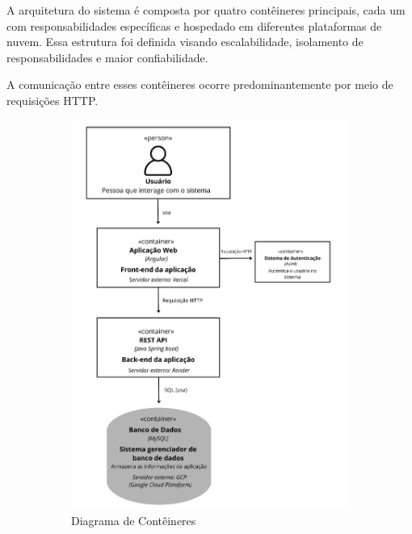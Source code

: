 \documentclass[
	article,			%
	12pt,				%
	oneside,			%
	a4paper,			%
    BIBLATEX,           %
	english,			%
	brazil,				%
	sumario=tradicional
	]{abntex2}
\begin{document}
A arquitetura do sistema é composta por quatro contêineres principais, cada um com responsabilidades específicas e hospedado em diferentes plataformas de nuvem. Essa estrutura foi definida visando escalabilidade, isolamento de responsabilidades e maior confiabilidade.

A comunicação entre esses contêineres ocorre predominantemente por meio de requisições HTTP.

\begin{figure}[h!]
    \centering
    \caption{Diagramas da Arquitetura de Software}
    \begin{subfigure}[b]{0.45\textwidth}
        \centering
        \includegraphics[width=\textwidth]{figuras/diagrama_conteineres.jpg}
        \caption{Diagrama de Contêineres}
        \label{fig:diagrama-conteineres}
    \end{subfigure}
    \hfill
    \begin{subfigure}[b]{0.45\textwidth}

\end{subfigure}
\end{figure}
\end{document}
